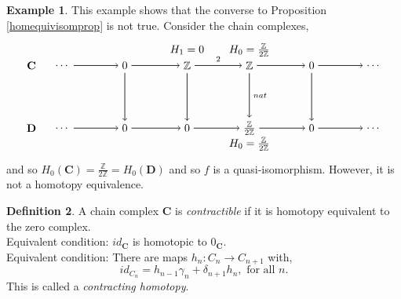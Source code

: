 \documentclass[11.5pt, twoside, a4paper, titlepage]{report}
\providecommand{\bb}[1]{\mathbb{#1}}
\theoremstyle{definition}
\newtheorem{mydef}{Definition}[section]
\newtheorem{eg}[mydef]{Example}
\theoremstyle{plain}
\begin{document}
\begin{eg}
This example shows that the converse to Proposition \ref{homequivisomprop} is not true. Consider the chain complexes, 
\begin{equation*}
\begin{tikzpicture}[->,-latex, auto, main path/.style={->, semithick}, main node/.style={}]
\node [main node]		(1) at (1,0)		{$\mathbf{C}$};
\node	[main node]		(2) at (2,0)		{\dots};
\node	[main node]		(3) at (4,0)		{$0$};
\node [main node]		(4) at (6,0)		{$\bb{Z}$};
\node [main node]		(5) at (8,0)		{$\bb{Z}$};
\node	[main node]		(11) at (10,0)	{$0$};
\node [main node]		(12) at (12,0)	{\dots};

\node [main node]		(6) at (1,-2)		{$\mathbf{D}$};
\node	[main node]		(7) at (2,-2)		{\dots};
\node	[main node]		(8) at (4,-2)		{$0$};
\node [main node]		(9) at (6,-2)		{$0$};
\node [main node]		(10) at (8,-2)	{$\frac{\bb{Z}}{2\bb{Z}}$};
\node [main node]		(13) at (10,-2)	{$0$};
\node [main node] 		(14) at (12, -2)	{\dots};

\node [main node] 		(15) at (8,0.5)	{$H_0=\frac{\bb{Z}}{2\bb{Z}}$};
\node [main node]		(16) at (6,0.5)	{$H_1=0$};
\node [main node]		(17) at (8,-2.5)	{$H_0=\frac{\bb{Z}}{2\bb{Z}}$};

\draw (2) edge [main path] node [auto] {$$} (3);
\draw (3) edge [main path] node [auto] {$$} (4);
\draw (4) edge [main path] node [auto] {$\scriptstyle{2}$} (5);
\draw (5) edge [main path] node [auto] {$$} (11);
\draw (11) edge [main path] (12);

\draw (7) edge [main path] node [auto] {$$} (8);
\path (8) edge [main path] node [auto, swap] {$$} (9);
\draw (9) edge [main path] node [auto, swap] {$$} (10);
\draw (10) edge [main path] node [auto, swap] {$$} (13);
\draw (13) edge [main path] (14);

\draw (3) edge [main path] node [auto, swap] {$$} (8);
\draw (4) edge [main path] node [auto] {$$} (9);
\draw (5) edge [main path] node [auto] {$\scriptstyle{nat}$} (10);
\draw (11) edge [main path] (13);
\end{tikzpicture}
\end{equation*}
and so $H_0(\mathbf{C})=\frac{\bb{Z}}{2\bb{Z}}=H_0(\mathbf{D})$ and so $f$ is a quasi-isomorphism. However, it is not a homotopy equivalence.
\end{eg}

\begin{mydef}
A chain complex $\mathbf{C}$ is \emph{contractible} if it is homotopy equivalent to the zero complex. \\
Equivalent condition: $id_{\mathbf{C}}$ is homotopic to $0_{\mathbf{C}}$.\\
Equivalent condition: There are maps $h_n: C_n \to C_{n+1}$ with,
\begin{equation*}
id_{C_n} = h_{n-1}\gamma_n + \delta_{n+1}h_n,\text{ for all } n.
\end{equation*}
This is called a \emph{contracting homotopy}.
\end{mydef}
\end{document}
